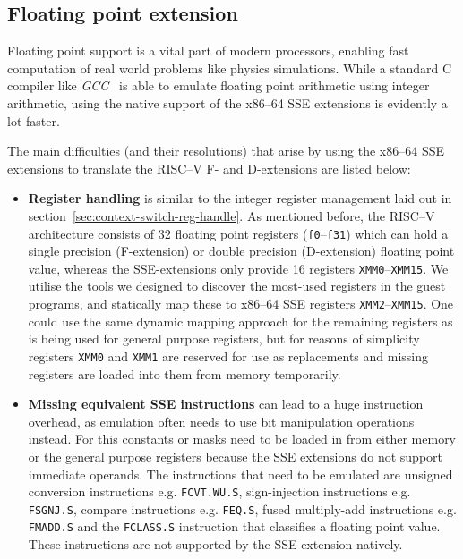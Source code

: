 \subsection{Floating point extension}
\label{subsec:fp_extension}
Floating point support is a vital part of modern processors, enabling fast computation of real world problems like physics simulations.
While a standard C compiler like \textit{GCC}~\cite{gcc-web} is able to emulate floating point arithmetic using integer arithmetic, using the native support of the x86--64 SSE extensions is evidently a lot faster.

The main difficulties (and their resolutions) that arise by using the x86--64 SSE extensions to translate the RISC--V F- and D-extensions are listed below:
\begin{itemize}
    \item \textbf{Register handling} is similar to the integer register management laid out in section~\ref{sec:context-switch-reg-handle}.
            As mentioned before, the RISC--V architecture consists of 32 floating point registers (\texttt{f0}--\texttt{f31}) which can hold a single precision (F-extension) or double precision (D-extension) floating point value, whereas the SSE-extensions only provide 16 registers \texttt{XMM0}--\texttt{XMM15}.
            We utilise the tools we designed to discover the most-used registers in the guest programs, and statically map these to x86--64 SSE registers \texttt{XMM2}--\texttt{XMM15}.
            One could use the same dynamic mapping approach for the remaining registers as is being used for general purpose registers, but for reasons of simplicity registers \texttt{XMM0} and \texttt{XMM1} are reserved for use as replacements and missing registers are loaded into them from memory temporarily.
    \item \textbf{Missing equivalent SSE instructions} can lead to a huge instruction overhead, as emulation often needs to use bit manipulation operations instead.
            For this constants or masks need to be loaded in from either memory or the general purpose registers because the SSE extensions do not support immediate operands.
            The instructions that need to be emulated are unsigned conversion instructions e.g. \texttt{FCVT.WU.S}, sign-injection instructions e.g. \texttt{FSGNJ.S}, compare instructions e.g. \texttt{FEQ.S}, fused multiply-add instructions e.g. \texttt{FMADD.S} and the \texttt{FCLASS.S} instruction that classifies a floating point value.
            These instructions are not supported by the SSE extension natively.

\end{itemize}

